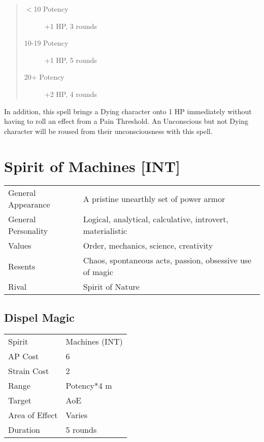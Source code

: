 \documentclass[11pt,a4paper,twocolumn]{book}
\begin{document}
\begin{quote}
	\begin{description}
		\item[$<$10 Potency] 	+1 HP, 3 rounds
		\item[10-19 Potency] 	+1 HP, 5 rounds
		\item[20+ Potency] 		+2 HP, 4 rounds
	\end{description}	
\end{quote}

In addition, this spell brings a Dying character onto 1 HP immediately without having to roll an effect from a Pain Threshold. An Unconscious but not Dying character will be roused from their unconsciousness with this spell.

\section*{Spirit of Machines [INT]}
{
	\begin{tabu} to 75mm{| X[l,4] | X[l,8] |}
		\hline
		General Appearance  & A pristine unearthly set of power armor                    \\
		General Personality & Logical, analytical, calculative, introvert, materialistic \\
		Values              & Order, mechanics, science, creativity                      \\
		Resents             & Chaos, spontaneous acts, passion, obsessive use of magic   \\
		Rival               & Spirit of Nature                                           \\ \hline
	\end{tabu}
	
}

\medskip

\subsection*{Dispel Magic}
{
	\begin{tabu} to 75mm{| X[l,4] | X[l,7] |}
		\hline
		Spirit         & Machines (INT) \\
		AP Cost        & 6              \\
		Strain Cost    & 2              \\
		Range          & Potency*4 m    \\
		Target         & AoE            \\
		Area of Effect & Varies         \\
		Duration       & 5 rounds       \\ \hline
	\end{tabu}
	
}
\end{document}
